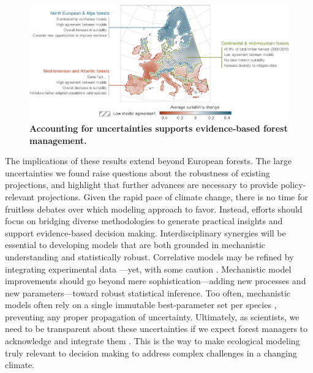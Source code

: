 \documentclass[11pt,letter]{article}
\begin{document}
\begin{figure}
	\centering
	\includegraphics[width=1\linewidth]{../newfigures/files/formanag}
	\caption{\textbf{Accounting for uncertainties supports evidence-based forest management.}}
	\label{fig:manag}
\end{figure}


The implications of these results extend beyond European forests. The large uncertainties we found raise questions about the robustness of existing projections, and highlight that further advances are necessary to provide policy-relevant projections. Given the rapid pace of climate change, there is no time for fruitless debates over which modeling approach to favor. Instead, efforts should focus on bridging diverse methodologies to generate practical insights and support evidence-based decision making. Interdisciplinary synergies will be essential to developing models that are both grounded in mechanistic understanding and statistically robust. Correlative models may be refined by integrating experimental data \citep{Kuo2022}---yet, with some caution \citep{Chevalier2024a}. Mechanistic model improvements should go beyond mere sophistication---adding new processes and new parameters---toward robust statistical inference. Too often, mechanistic models often rely on a single immutable best-parameter set per species \citep{Harrison2021}, preventing any proper propagation of uncertainty. Ultimately, as scientists, we need to be transparent about these uncertainties if we expect forest managers to acknowledge and integrate them \citep{Saltelli2020}. This is the way to make ecological modeling truly relevant to decision making to address complex challenges in a changing climate.
\end{document}
